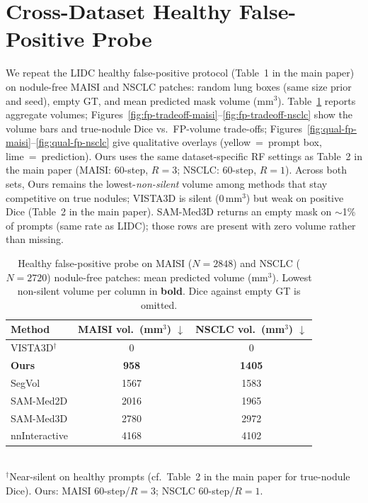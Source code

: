 \documentclass[twoside]{article}
\newcommand{\mainTabHealthyFP}{Table~1}
\newcommand{\mainTabCross}{Table~2}
\begin{document}
\section{Cross-Dataset Healthy False-Positive Probe}
\label{sec:supp:healthy-fp-cross}
We repeat the LIDC healthy false-positive protocol
(\mainTabHealthyFP{} in the main paper) on nodule-free MAISI
and NSCLC patches: random lung boxes (same size prior and seed),
empty GT, and mean predicted mask volume (mm\(^3\)).
Table~\ref{tab:healthy-fp-cross} reports aggregate volumes;
Figures~\ref{fig:fp-tradeoff-maisi}--\ref{fig:fp-tradeoff-nsclc}
show the volume bars and true-nodule Dice vs.\ FP-volume trade-offs;
Figures~\ref{fig:qual-fp-maisi}--\ref{fig:qual-fp-nsclc} give
qualitative overlays (yellow~=~prompt box, lime~=~prediction).
Ours uses the same dataset-specific RF settings as
\mainTabCross{} in the main paper
(MAISI: \(60\)-step, \(R{=}3\); NSCLC: \(60\)-step, \(R{=}1\)).
Across both sets, Ours remains the lowest-\emph{non-silent} volume among
methods that stay competitive on true nodules; VISTA3D is silent
(\(0\,\mathrm{mm}^3\)) but weak on positive Dice
(\mainTabCross{} in the main paper). SAM-Med3D returns an empty
mask on \(\sim\)1\% of prompts (same rate as LIDC); those rows are
present with zero volume rather than missing.

\begin{table}[t]
\centering
\caption{Healthy false-positive probe on MAISI (\(N{=}2848\)) and
NSCLC (\(N{=}2720\)) nodule-free patches: mean predicted volume
(mm\(^3\)). Lowest non-silent volume per column in \textbf{bold}.
Dice against empty GT is omitted.}
\label{tab:healthy-fp-cross}
\begin{tabular}{lcc}
\toprule
Method & MAISI vol.\ (mm\(^3\)) \(\downarrow\) &
NSCLC vol.\ (mm\(^3\)) \(\downarrow\) \\
\midrule
VISTA3D$^\dagger$
  & \(0\) & \(0\) \\
\textbf{Ours}
  & \textbf{958} & \textbf{1405} \\
SegVol
  & 1567 & 1583 \\
SAM-Med2D
  & 2016 & 1965 \\
SAM-Med3D
  & 2780 & 2972 \\
nnInteractive
  & 4168 & 4102 \\
\bottomrule
\end{tabular}\\[0.25em]
{\footnotesize $^\dagger$Near-silent on healthy prompts (cf.\
\mainTabCross{} in the main paper for true-nodule Dice).
Ours: MAISI \(60\)-step/\(R{=}3\); NSCLC \(60\)-step/\(R{=}1\).}
\end{table}
\end{document}
